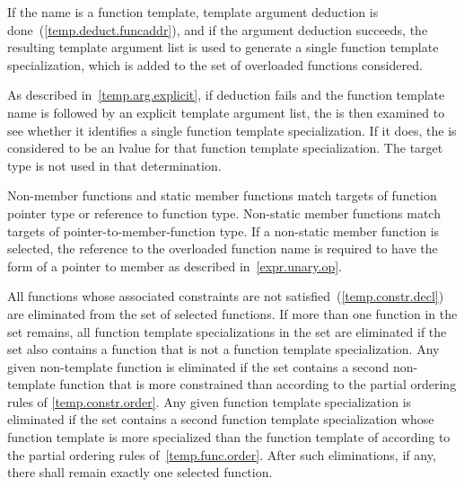 \pnum
If the name is a function template, template argument deduction is
done~(\ref{temp.deduct.funcaddr}), and if the argument deduction succeeds,
the
resulting template argument list is
used to generate a single
function template specialization,
which is added to the set of overloaded functions
considered.
\begin{note}
As described in~\ref{temp.arg.explicit}, if deduction fails and the
function template name is followed by an explicit template argument list,
the
is then examined to see whether it identifies a single function template
specialization. If it does, the
is considered to be an lvalue for that function template specialization.
The target type is not used in that determination.
\end{note}

\pnum
Non-member functions and static member functions
match targets of function pointer type or
reference to function type.
Non-static member functions match targets of
pointer-to-member-function type.
If a non-static member function is selected, the reference to the overloaded
function name is required to have the form of a pointer to member as
described in~\ref{expr.unary.op}.

\pnum
All functions whose
associated constraints are not satisfied~(\ref{temp.constr.decl})
are eliminated from the set of selected functions.
If more than one function in the set remains,
all function template specializations
in the set
are eliminated if the set also contains a function that is not a
function template specialization.
Any given non-template function
is eliminated if the set contains a second
non-template function that
is more constrained than
according to
the partial ordering rules of \ref{temp.constr.order}.
Any given
function template specialization
is eliminated if the set contains a second
function template specialization whose function template
is more specialized than the
function template of
according to
the partial ordering rules of~\ref{temp.func.order}.
After such eliminations,
if any, there shall remain exactly one selected function.


